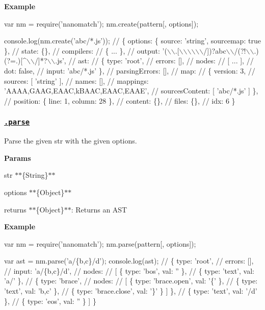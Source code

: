{\bfseries Example}


\begin{DoxyCode}
var nm = require('nanomatch');
nm.create(pattern[, options]);

console.log(nm.create('abc/*.js'));
// \{ options: \{ source: 'string', sourcemap: true \},
//   state: \{\},
//   compilers:
//    \{ ... \},
//   output: '(\(\backslash\)\(\backslash\).[\(\backslash\)\(\backslash\)\(\backslash\)\(\backslash\)\(\backslash\)\(\backslash\)/])?abc\(\backslash\)\(\backslash\)/(?!\(\backslash\)\(\backslash\).)(?=.)[^\(\backslash\)\(\backslash\)/]*?\(\backslash\)\(\backslash\).js',
//   ast:
//    \{ type: 'root',
//      errors: [],
//      nodes:
//       [ ... ],
//      dot: false,
//      input: 'abc/*.js' \},
//   parsingErrors: [],
//   map:
//    \{ version: 3,
//      sources: [ 'string' ],
//      names: [],
//      mappings: 'AAAA,GAAG,EAAC,kBAAC,EAAC,EAAE',
//      sourcesContent: [ 'abc/*.js' ] \},
//   position: \{ line: 1, column: 28 \},
//   content: \{\},
//   files: \{\},
//   idx: 6 \}
\end{DoxyCode}


\subsubsection*{\href{index.js#L697}{\tt .parse}}

Parse the given {\ttfamily str} with the given {\ttfamily options}.

{\bfseries Params}


\begin{DoxyItemize}
\item {\ttfamily str} $\ast$$\ast$\{String\}$\ast$$\ast$
\item {\ttfamily options} $\ast$$\ast$\{Object\}$\ast$$\ast$
\item {\ttfamily returns} $\ast$$\ast$\{Object\}$\ast$$\ast$\+: Returns an A\+ST
\end{DoxyItemize}

{\bfseries Example}


\begin{DoxyCode}
var nm = require('nanomatch');
nm.parse(pattern[, options]);

var ast = nm.parse('a/\{b,c\}/d');
console.log(ast);
// \{ type: 'root',
//   errors: [],
//   input: 'a/\{b,c\}/d',
//   nodes:
//    [ \{ type: 'bos', val: '' \},
//      \{ type: 'text', val: 'a/' \},
//      \{ type: 'brace',
//        nodes:
//         [ \{ type: 'brace.open', val: '\{' \},
//           \{ type: 'text', val: 'b,c' \},
//           \{ type: 'brace.close', val: '\}' \} ] \},
//      \{ type: 'text', val: '/d' \},
//      \{ type: 'eos', val: '' \} ] \}
\end{DoxyCode}



